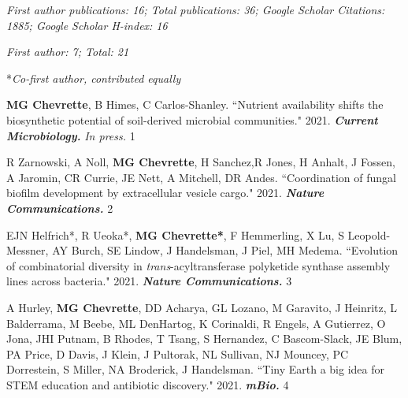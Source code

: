 

\textit{First author publications: 16; Total publications: 36; Google Scholar Citations: 1885; Google Scholar H-index: 16}

 \vspace{-2mm}

\begin{cvpubs}

\cvpub
{\hspace{-1cm} \textit{First author: 7; Total: 21}}
{}

\cvpub
{\hspace{-1cm} *\textit{Co-first author, contributed equally}} %
{}

\cvpub
{\textbf{MG Chevrette}, B Himes, C Carlos-Shanley. ``Nutrient availability shifts the biosynthetic potential of soil-derived microbial communities." 2021. \textit{\textbf{Current Microbiology.}} \textit{In press.} \textit{\textbf{}}}
{1}

\cvpub
{R Zarnowski, A Noll, \textbf{MG Chevrette}, H Sanchez,R Jones, H Anhalt, J Fossen, A Jaromin, CR Currie, JE Nett, A Mitchell, DR Andes. ``Coordination of fungal biofilm development by extracellular vesicle cargo." 2021. \textit{\textbf{Nature Communications.}} \textit{\textbf{}}}
{2}

\cvpub
{EJN Helfrich*, R Ueoka*, \textbf{MG Chevrette*}, F Hemmerling, X Lu, S Leopold-Messner, AY Burch, SE Lindow, J Handelsman, J Piel, MH Medema. ``Evolution of combinatorial diversity in \textit{trans}-acyltransferase polyketide synthase assembly lines across bacteria." 2021. \textit{\textbf{Nature Communications.}} \textit{\textbf{}}}
{3}

\cvpub
{A Hurley, \textbf{MG Chevrette}, DD Acharya, GL Lozano, M Garavito, J Heinritz, L Balderrama, M Beebe, ML DenHartog, K Corinaldi, R Engels, A Gutierrez, O Jona, JHI Putnam, B Rhodes, T Tsang, S Hernandez, C Bascom-Slack, JE Blum, PA Price, D Davis, J Klein, J Pultorak, NL Sullivan, NJ Mouncey, PC Dorrestein, S Miller, NA Broderick, J Handelsman. ``Tiny Earth\: a big idea for STEM education and antibiotic discovery." 2021. \textit{\textbf{mBio.}} \textit{\textbf{}}}
{4}


\end{cvpubs}
